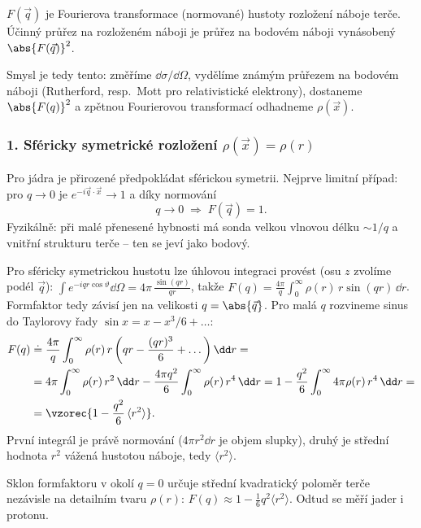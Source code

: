 \begin{definice}[Formfaktor]
 \(F(\vec q)\) je Fourierova transformace (normované) hustoty
rozložení náboje terče. Účinný průřez na rozloženém náboji je průřez na
bodovém náboji vynásobený \(\abs{F(\vec q)}^2\).
\end{definice}

Smysl je tedy tento: změříme \(\dd\sigma/\dd\Omega\), vydělíme známým
průřezem na bodovém náboji (Rutherford, resp.\ Mott pro relativistické
elektrony), dostaneme \(\abs{F(q)}^2\) a zpětnou Fourierovou transformací
odhadneme \(\rho(\vec x)\).

\subsubsection*{1. Sféricky symetrické rozložení \(\rho(\vec x)=\rho(r)\)}

Pro jádra je přirozené předpokládat sférickou symetrii. Nejprve limitní
případ: pro \(q\to 0\) je \(e^{-i\vec q\cdot\vec x}\to 1\) a díky normování
\[
  q\to 0 \;\Rightarrow\; F(\vec q) = 1 .
\]
Fyzikálně: při malé přenesené hybnosti má sonda velkou vlnovou délku
\(\sim 1/q\) a  vnitřní strukturu terče -- ten se jeví jako
bodový.

Pro sféricky symetrickou hustotu lze úhlovou integraci provést (osu \(z\)
zvolíme podél \(\vec q\)): \(\int e^{-iqr\cos\vartheta}\dd\Omega
= 4\pi\,\frac{\sin(qr)}{qr}\), takže
\(F(q) = \frac{4\pi}{q}\int_0^\infty \rho(r)\,r\sin(qr)\,\dd r\). Formfaktor
tedy závisí jen na velikosti \(q=\abs{\vec q}\). Pro malá \(q\) rozvineme sinus
do Taylorovy řady \(\sin x = x - x^3/6 + \dots\):
\begin{align*}
  F(q) &\doteq \frac{4\pi}{q}\int_0^\infty \rho(r)\,r\left(qr - \frac{(qr)^3}{6} + \dots\right)\dd r = \\
  &= 4\pi\int_0^\infty \rho(r)\,r^2\,\dd r - \frac{4\pi q^2}{6}\int_0^\infty \rho(r)\,r^4\,\dd r
   = 1 - \frac{q^2}{6}\int_0^\infty 4\pi\rho(r)\,r^4\,\dd r = \\
  &= \vzorec{1 - \frac{q^2}{6}\,\langle r^2\rangle} .
\end{align*}
První integrál je právě normování (\(4\pi r^2\dd r\) je objem slupky), druhý
je střední hodnota \(r^2\) vážená hustotou náboje, tedy  \(\langle r^2\rangle\).

\begin{veta}
Sklon formfaktoru v okolí \(q=0\) určuje střední kvadratický poloměr terče
nezávisle na detailním tvaru \(\rho(r)\):
\(F(q)\approx 1-\tfrac{1}{6}q^2\langle r^2\rangle\).
Odtud se měří  jader i protonu.
\end{veta}

